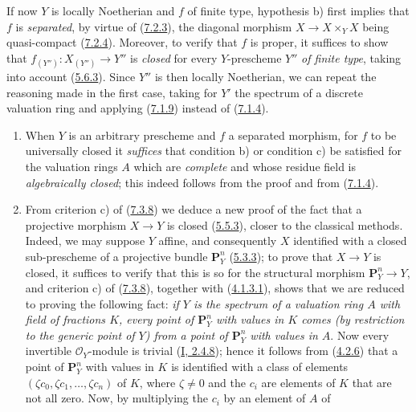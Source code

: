 If now $Y$ is locally Noetherian and $f$ of finite type, hypothesis b)
first implies that $f$ is \emph{separated}, by virtue of
(\hyperref[II.7.2.3]{7.2.3}), the diagonal morphism $X\to X\times_YX$
being quasi-compact (\hyperref[II.7.2.4]{7.2.4}). Moreover, to verify
that $f$ is proper, it suffices to show that $f_{(Y'')}:X_{(Y'')}\to Y''$ is
\emph{closed} for every $Y$-prescheme $Y''$ \emph{of finite type}, taking into
account (\hyperref[II.5.6.3]{5.6.3}). Since $Y''$ is then locally
Noetherian, we can repeat the reasoning made in the first case, taking for
$Y'$ the spectrum of a discrete valuation ring and applying
(\hyperref[II.7.1.9]{7.1.9}) instead of
(\hyperref[II.7.1.4]{7.1.4}).

\begin{remark}[7.3.9]
\label{II.7.3.9}
\begin{enumerate}
\item[\rm (i)] When $Y$ is an arbitrary prescheme and $f$ a separated
morphism, for $f$ to be universally closed it \emph{suffices} that
condition b) or condition c) be satisfied for the valuation rings
$A$ which are \emph{complete} and whose residue field is \emph{algebraically
closed}; this indeed follows from the proof and from
(\hyperref[II.7.1.4]{7.1.4}).
\item[\rm (ii)] From criterion c) of
(\hyperref[II.7.3.8]{7.3.8}) we deduce a new proof of the fact that a
projective morphism $X\to Y$ is closed (\hyperref[II.5.5.3]{5.5.3}), closer
to the classical methods. Indeed, we may suppose $Y$ affine, and consequently
$X$ identified with a closed sub-prescheme of a projective bundle
$\mathbf{P}_Y^n$ (\hyperref[II.5.3.3]{5.3.3}); to prove that $X\to Y$
is closed, it suffices to verify that this is so for the structural morphism
$\mathbf{P}_Y^n\to Y$, and criterion c) of
(\hyperref[II.7.3.8]{7.3.8}), together with
(\hyperref[II.4.1.3.1]{4.1.3.1}), shows that we are reduced to proving the
following fact: \emph{if $Y$ is the spectrum of a valuation ring $A$ with
field of fractions $K$, every point of $\mathbf{P}_Y^n$ with values in $K$
comes (by restriction to the generic point of $Y$) from a point of
$\mathbf{P}_Y^n$ with values in $A$}. Now every invertible
$\mathcal{O}_Y$-module is trivial (\hyperref[I.2.4.8]{I, 2.4.8}); hence it
follows from (\hyperref[II.4.2.6]{4.2.6}) that a point of $\mathbf{P}_Y^n$
with values in $K$ is identified with a class of elements $(\zeta c_0,\zeta c_1,\ldots,\zeta
c_n)$ of $K$, where $\zeta\neq0$ and the $c_i$ are elements of $K$ that are
not all zero. Now, by multiplying the $c_i$ by an element of $A$ of

\end{enumerate}
\end{remark}
